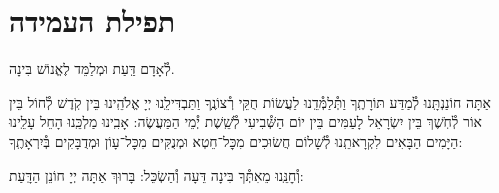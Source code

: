 \documentclass[twoside, openany, parskip=half, 11pt]{book}
\begin{document}
\boruchhashemleolam

\yerueinnu

\halfkaddish

\section*{ תפילת העמידה }


\amidaopening{\ayt}{}

לְ֯אָדָם דַּֽעַת וּמְלַמֵּד לֶאֱנוֹשׁ בִּינָה.
\begin{narrow}
אַתָּה חוֹנַנְתָּֽנוּ לְ֯מַדַּע תּוֹרָתֶֽךָ וַתְּ֯לַמְּ֯דֵֽנוּ לַעֲשׂוֹת חֻקֵּי רְ֯צוֹנֶֽךָ וַתַּבְדִּילֵֽנוּ יְיָ אֱלֹהֵֽינוּ בֵּין קֹֽדֶשׁ לְ֯חוֹל בֵּין אוֹר לְ֯חֹֽשֶׁךְ בֵּין יִשְׂרָאֵל לָעַמִּים בֵּין יוֹם הַשְּׁ֯בִיעִי לְ֯שֵֽׁשֶׁת יְ֯מֵי הַמַּעֲשֶׂה: אָבִֽינוּ מַלְכֵּֽנוּ הָחֵל עָלֵֽינוּ הַיָּמִים הַבָּאִים לִקְרָאתֵֽנוּ לְ֯שָׁלוֹם חֲשׂוּכִים מִכׇּל־חֵטְא וּמְנֻקִּים מִכׇּל־עָוֹן וּמְדֻבָּקִים בְּ֯יִרְאָתֶֽךָ:\\
\end{narrow}
וְ֯חׇנֵּֽנוּ מֵאִתְּ֯ךָ בִּינָה דֵּעָה וְ֯הַשְׂכֵּל: בָּרוּךְ אַתָּה יְיָ חוֹנֵן הַדָּֽעַת:

\weekdaysateshuva

\weekdaysaselichah

\weekdaysageulah

\weekdaysarefuah

\weekdaysaberacha

\weekdaysashofar

\weekdaysamishpat

\weekdaysaminim

\weekdaysatzadikim

\weekdaysayerushelayim

\weekdaysamalchus

\weekdaysashemakoleinu

\retzeh

\clearpage

\vspace{-\baselineskip}
\yaalehveyavo

\zion

\newcommand{\maarivmodim}{
\firstword{מוֹדִים}
אֲנַֽחְנוּ לָךְ שָׁאַתָּה הוּא יְיָ אֱלֹהֵֽינוּ וֵאלֹהֵי אֲבוֹתֵֽינוּ לְ֯עוֹלָם וָעֶד צוּר חַיֵּֽינוּ מָגֵן יִשְׁעֵֽנוּ אַתָּה הוּא לְ֯דוֹר וָדוֹר: נוֹדֶה לְּ֯ךָ וּנְסַפֵּר תְּ֯הִלָּתֶֽךָ עַל חַיֵּֽינוּ הַמְּ֯סוּרִים בְּ֯יָדֶֽךָ וְ֯עַל נִשְׁמוֹתֵֽינוּ הַפְּ֯קוּדוֹת לָךְ וְ֯עַל נִסֶּֽיךָ שֶׁבְּ֯כׇל־יוֹם עִמָּֽנוּ וְ֯עַל נִפְלְ֯אוֹתֶֽיךָ וְ֯טוֹבוֹתֶֽיךָ שֶׁבְּ֯כׇל־עֵת עֶֽרֶב וָבֹֽקֶר וְ֯צׇהֳרָֽיִם: הַטּוֹב כִּי לֹא כָלוּ רַחֲמֶֽיךָ וְ֯הַמְ֯רַחֵם כִּי לֹא תַֽמּוּ חֲסָדֶֽיךָ מֵעוֹלָם קִוִֽינוּ לָךְ:
}
\end{document}
